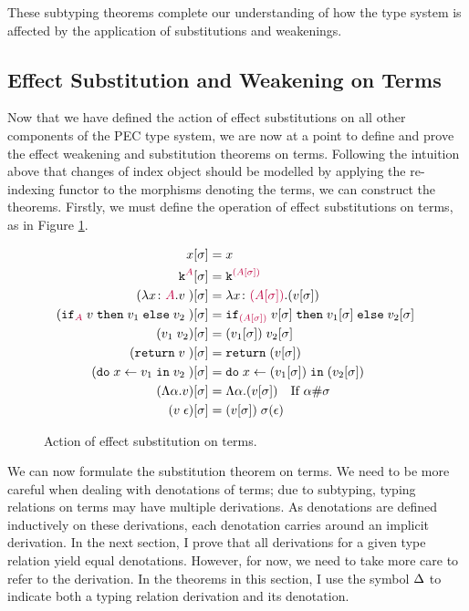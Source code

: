 These subtyping theorems complete our understanding of how the type system is affected by the application of substitutions and weakenings.

\subsection{Effect Substitution and Weakening on Terms}
Now that we have defined the action of effect substitutions on all other components of the PEC type system, we are now at a point to define and prove the effect weakening and substitution theorems on terms. Following the intuition above that changes of index object should be modelled by applying the re-indexing functor to the morphisms denoting the terms, we can construct the theorems. Firstly, we must define the operation of effect substitutions on terms, as in Figure \ref{EffectSubstitutionActionTerms}.

\begin{figure}[H]
    \centering
    \begin{framed}
        
\begin{align*}
    x[\sigma] & = x \\
    \texttt{k}^{\color{purple} A}[\sigma] & = \texttt{k}^{\color{purple} (A[\sigma])} \\
    (\lambda x \colon {\color{purple}A}. v\;)[\sigma] &= \lambda x \colon {\color{purple}(A[\sigma])}. (v[\sigma])\;\\
    (\texttt{if}_{\textcolor{purple}{A}}\; v\; \texttt{then}\; v_1 \;\texttt{else} \; v_2\;)[\sigma] &= \texttt{if}_{\textcolor{purple}{(A[\sigma])}}\; v[\sigma]\; \texttt{then}\; v_1[\sigma] \;\texttt{else} \; v_2[\sigma]\;\\
    (v_1\; v_2)[\sigma]&= (v_1[\sigma])\; v_2[\sigma]\\
    (\texttt{return} \; v\;)[\sigma] &= \texttt{return} \;(v[\sigma])\;\\
    (\texttt{do}\; x \leftarrow v_1 \;\texttt{in}\; v_2\;)[\sigma]&= \texttt{do}\; x \leftarrow (v_1[\sigma]) \;\texttt{in}\; (v_2[\sigma])\;\\
    (\Lambda \alpha. v)[\sigma] & = \Lambda \alpha. (v[\sigma])\quad\text{If $\alpha\#\sigma$}\\
    (v\;\epsilon)[\sigma] & = (v[\sigma])\;\sigma(\epsilon)\\
\end{align*}
    \end{framed}
    
    \caption{Action of effect substitution on terms.}
    \label{EffectSubstitutionActionTerms}
\end{figure}

We can now formulate the substitution theorem on terms. We need to be more careful when dealing with denotations of terms; due to subtyping, typing relations on terms may have multiple derivations. As denotations are defined inductively on these derivations, each denotation carries around an implicit derivation. In the next section, I prove that all derivations for a given type relation yield equal denotations. However, for now, we need to take more care to refer to the derivation. In the theorems in this section, I use the symbol $\Delta$ to indicate both a typing relation derivation and its denotation.



